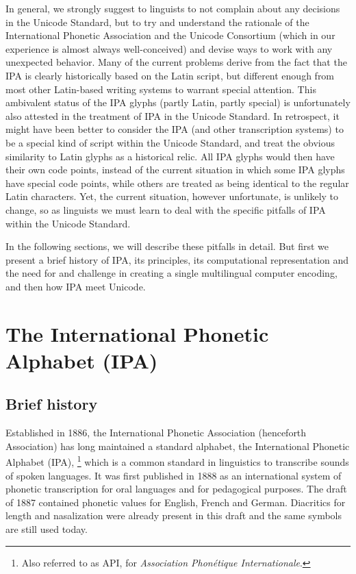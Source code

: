 In general, we strongly suggest to linguists to not complain about any decisions in
the Unicode Standard, but to try and understand the rationale of the International Phonetic Association 
and the Unicode Consortium (which in our experience is almost always well-conceived) and devise
ways to work with any unexpected behavior. Many of the current problems derive
from the fact that the IPA is clearly historically based on the Latin script,
but different enough from most other Latin-based writing systems to warrant
special attention. This ambivalent status of the IPA glyphs (partly Latin,
partly special) is unfortunately also attested in the treatment of IPA in the
Unicode Standard. In retrospect, it might have been better to consider the IPA
(and other transcription systems) to be a special kind of script within
the Unicode Standard, and treat the obvious similarity to Latin glyphs as a
historical relic. All IPA glyphs would then have their own code points, instead
of the current situation in which some IPA glyphs have special code points,
while others are treated as being identical to the regular Latin characters.
Yet, the current situation, however unfortunate, is unlikely to change, so as
linguists we must learn to deal with the specific pitfalls of IPA within
the Unicode Standard. 

In the following sections, we will describe these pitfalls 
in detail. But first we present a brief history of IPA, its principles, 
its computational representation and the need for and challenge in creating 
a single multilingual computer encoding, and then how IPA meet Unicode.

\section{The International Phonetic Alphabet (IPA)}
\label{the-international-phonetic-alphabet}

\subsection{Brief history}

Established in 1886, the International Phonetic Association (henceforth Association) 
has long maintained a standard alphabet, the International Phonetic Alphabet (IPA),
\footnote{Also referred to as API, for \textit{Association Phonétique Internationale}.} 
which is a common standard in linguistics to transcribe sounds of spoken languages. 
It was first published in 1888 as an international system of phonetic transcription 
for oral languages and for pedagogical purposes. The draft of 1887 contained phonetic 
values for English, French and German. Diacritics for length and nasalization were 
already present in this draft and the same symbols are still used today. 


